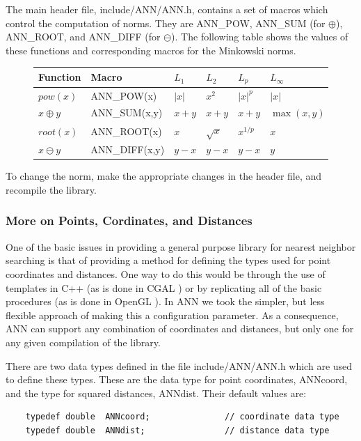 \documentclass[11pt]{article}		%
\newcommand{\ANN}[0]{\textsf{ANN}}
\newcommand{\ROOT}[0]{\textit{root}}
\newcommand{\POW}[0]{\textit{pow}}
\newcommand{\DIFF}[0]{\ominus}
\newcommand{\SUM}[0]{\oplus}
\begin{document}
The main header file, \textsf{include/ANN/ANN.h}, contains a set of
macros which control the computation of norms.  They are
\textsf{ANN\_POW}, \textsf{ANN\_SUM} (for $\SUM$), \textsf{ANN\_ROOT},
and \textsf{ANN\_DIFF} (for $\DIFF$).  The following table shows the
values of these functions and corresponding macros for the Minkowski
norms.

\begin{figure}[htbp]
\begin{center}
\begin{tabular}{||l|l||l|l|l|l||}
\hline\hline
Function    & Macro		  & $L_1$ & $L_2$   & $L_p$  & $L_{\infty}$\\
\hline
$\POW(x)$   & \textsf{ANN\_POW(x)}   & $|x|$ & $x^2$   & $|x|^p$& $|x|$	\\
$x \SUM y$  & \textsf{ANN\_SUM(x,y)} & $x+y$ & $x+y$   & $x+y$  & $\max(x, y)$\\
$\ROOT(x)$  & \textsf{ANN\_ROOT(x)}  & $x$	  & $\sqrt{x}$& $x^{1/p}$& $x$	\\
$x \DIFF y$ & \textsf{ANN\_DIFF(x,y)}& $y-x$ & $y-x$   & $y-x$  & $y$	\\
\hline\hline
\end{tabular}
\end{center}
\end{figure}

To change the norm, make the appropriate changes in the header file,
and recompile the library.

\subsubsection{More on Points, Cordinates, and Distances}\label{point2.sec}

One of the basic issues in providing a general purpose library for
nearest neighbor searching is that of providing a method for defining
the types used for point coordinates and distances.  One way to do this
would be through the use of templates in C++ (as is done in CGAL
\cite{Ove96}) or by replicating all of the basic procedures (as is done
in OpenGL \cite{Ope93}).  In {\ANN} we took the simpler, but less
flexible approach of making this a configuration parameter.  As a
consequence, {\ANN} can support any combination of coordinates and
distances, but only one for any given compilation of the library.

There are two data types defined in the file \textsf{include/ANN/ANN.h}
which are used to define these types.  These are the data type for point
coordinates, \textsf{ANNcoord}, and the type for squared distances,
\textsf{ANNdist}.  Their default values are:
{\small \begin{verbatim}
    typedef double  ANNcoord;               // coordinate data type
    typedef double  ANNdist;                // distance data type
\end{verbatim} }
\end{document}
